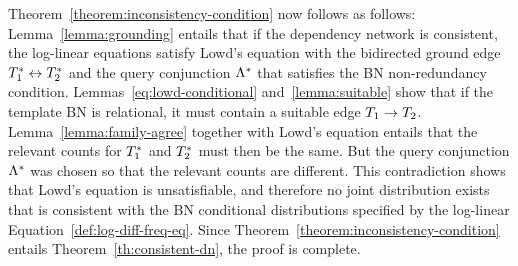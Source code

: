 \documentclass{sfuthesis}
\begin{document}
\begin{appendices}
Theorem~\ref{theorem:inconsistency-condition} now follows as follows: Lemma~\ref{lemma:grounding} entails that if the dependency network is consistent, the log-linear equations satisfy Lowd's equation with the bidirected ground edge $T_{1}^{*}\hspace{0.0ex} \leftrightarrow T_{2}^{*}\hspace{0.0ex}$ and the query conjunction $\Lambda^{*}\hspace{0.0ex}$ that satisfies the BN non-redundancy condition. Lemmas~\ref{eq:lowd-conditional} and~\ref{lemma:suitable} show that if the template BN is relational, it must contain a suitable edge $T_{1} \rightarrow T_{2}$. Lemma~\ref{lemma:family-agree} 
 together with Lowd's equation entails that the relevant counts for $T_{1}^{*}\hspace{0.0ex}$ and $T_{2}^{*}\hspace{0.0ex}$ must then be the same. But the query conjunction $\Lambda^{*}\hspace{0.0ex}$ was chosen so that the relevant counts are different. This contradiction shows that Lowd's equation is unsatisfiable, and therefore no joint distribution exists that is consistent with the BN conditional distributions specified by the log-linear Equation~\ref{def:log-diff-freq-eq}. Since Theorem~\ref{theorem:inconsistency-condition} entails Theorem~\ref{th:consistent-dn}, the proof is complete.

\end{appendices}
\end{document}
